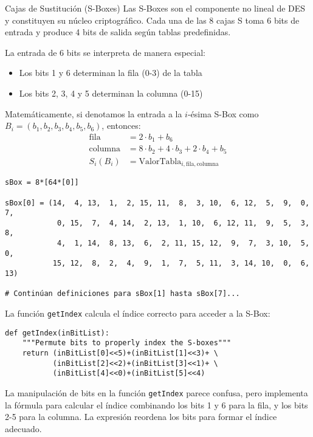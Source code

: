 \begin{cryptoanalysis}{Cajas de Sustitución (S-Boxes)}
Las S-Boxes son el componente no lineal de DES y constituyen su núcleo criptográfico. Cada una de las 8 cajas S toma 6 bits de entrada y produce 4 bits de salida según tablas predefinidas.

La entrada de 6 bits se interpreta de manera especial:
\begin{itemize}
    \item Los bits 1 y 6 determinan la fila (0-3) de la tabla
    \item Los bits 2, 3, 4 y 5 determinan la columna (0-15)
\end{itemize}

Matemáticamente, si denotamos la entrada a la $i$-ésima S-Box como $B_i = (b_1, b_2, b_3, b_4, b_5, b_6)$, entonces:
\begin{align}
\text{fila} &= 2 \cdot b_1 + b_6 \\
\text{columna} &= 8 \cdot b_2 + 4 \cdot b_3 + 2 \cdot b_4 + b_5 \\
S_i(B_i) &= \text{ValorTabla}_{i,\text{fila},\text{columna}}
\end{align}
\end{cryptoanalysis}

\begin{lstlisting}[style=cryptoalgo, caption={Definición de S-Boxes}, label=lst:sboxes]
sBox = 8*[64*[0]]

sBox[0] = (14,  4, 13,  1,  2, 15, 11,  8,  3, 10,  6, 12,  5,  9,  0,  7,
            0, 15,  7,  4, 14,  2, 13,  1, 10,  6, 12, 11,  9,  5,  3,  8,
            4,  1, 14,  8, 13,  6,  2, 11, 15, 12,  9,  7,  3, 10,  5,  0,
           15, 12,  8,  2,  4,  9,  1,  7,  5, 11,  3, 14, 10,  0,  6, 13)

# Continúan definiciones para sBox[1] hasta sBox[7]...
\end{lstlisting}

La función \texttt{getIndex} calcula el índice correcto para acceder a la S-Box:

\begin{lstlisting}[style=cryptoalgo]
def getIndex(inBitList):
    """Permute bits to properly index the S-boxes"""
    return (inBitList[0]<<5)+(inBitList[1]<<3)+ \
           (inBitList[2]<<2)+(inBitList[3]<<1)+ \
           (inBitList[4]<<0)+(inBitList[5]<<4)
\end{lstlisting}

\begin{securitywarning}
La manipulación de bits en la función \texttt{getIndex} parece confusa, pero implementa la fórmula para calcular el índice combinando los bits 1 y 6 para la fila, y los bits 2-5 para la columna. La expresión reordena los bits para formar el índice adecuado.
\end{securitywarning}

